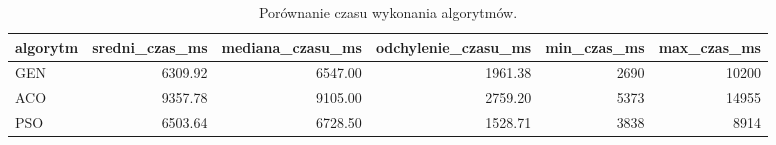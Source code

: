 \begin{table}
\caption{Porównanie czasu wykonania algorytmów.}
\label{tab:czas_wykonania}
\begin{tabular}{lrrrrr}
\toprule
algorytm & sredni_czas_ms & mediana_czasu_ms & odchylenie_czasu_ms & min_czas_ms & max_czas_ms \\
\midrule
GEN & 6309.92 & 6547.00 & 1961.38 & 2690 & 10200 \\
ACO & 9357.78 & 9105.00 & 2759.20 & 5373 & 14955 \\
PSO & 6503.64 & 6728.50 & 1528.71 & 3838 & 8914 \\
\bottomrule
\end{tabular}
\end{table}
